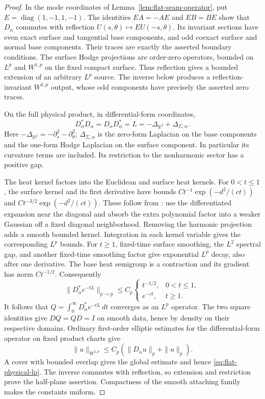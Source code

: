 \documentclass[11pt]{amsart}
\theoremstyle{definition}
\theoremstyle{remark}
\theoremstyle{plain}
\newcommand{\RR}{\mathbb{R}}
\begin{document}
\begin{proof}
In the mode coordinates of Lemma~\ref{lem:flat-seam-operator}, put
$E=\operatorname{diag}(1,-1,1,-1)$. The identities
$EA=-AE$ and $EB=BE$ show that $D_\alpha$ commutes with reflection
$U(s,\theta)\mapsto EU(-s,\theta)$. Its invariant sections have even
exact surface and tangential base components, and odd coexact surface
and normal base components. Their traces are exactly the asserted
boundary conditions. The surface Hodge projections are order-zero
operators, bounded on $L^p$ and $W^{1,p}$ on the fixed compact surface.
Thus reflection gives a bounded extension of an arbitrary $L^p$
source. The inverse below produces a reflection-invariant $W^{1,p}$
output, whose odd components have precisely the asserted zero traces.

On the full physical product, in differential-form coordinates,
\[
 D_\alpha^*D_\alpha=D_\alpha D_\alpha^*
 =L=-\Delta_{\RR^2}+\Delta_{\Sigma,\alpha}.
\]
Here $-\Delta_{\RR^2}=-\partial_s^2-\partial_\theta^2$;
$\Delta_{\Sigma,\alpha}$ is the zero-form Laplacian on the base
components and the one-form Hodge Laplacian on the surface component.
In particular its curvature terms are included. Its restriction to the
nonharmonic sector has a positive gap.

The heat kernel factors into the Euclidean and surface heat kernels.
For $0<t\leq1$, the surface kernel and its first derivative have bounds
$Ct^{-1}\exp(-d^2/(ct))$ and $Ct^{-3/2}\exp(-d^2/(ct))$.
These follow from \cite[Theorems~1.1 and 3.5]{Ludewig19}: use the
differentiated expansion near the diagonal and absorb the extra
polynomial factor into a weaker Gaussian off a fixed diagonal
neighborhood. Removing the harmonic projection adds a smooth bounded
kernel. Integration in each kernel variable gives the corresponding
$L^p$ bounds. For $t\geq1$, fixed-time surface smoothing, the $L^2$
spectral gap, and another fixed-time smoothing factor give exponential
$L^p$ decay, also after one derivative. The base heat semigroup is a
contraction and its gradient has norm $Ct^{-1/2}$. Consequently
\[
 \|D_\alpha^*e^{-tL}\|_{p\to p}
 \leq C_p\begin{cases}t^{-1/2},&0<t\leq1,\\e^{-ct},&t\geq1.\end{cases}
\]
It follows that $Q=\int_0^\infty D_\alpha^*e^{-tL}\,dt$ converges
as an $L^p$ operator. The two square identities give $DQ=QD=I$ on
smooth data, hence by density on their respective domains. Ordinary
first-order elliptic estimates for the differential-form operator on
fixed product charts give
\[
 \|u\|_{W^{1,p}}\leq C_p(\|D_\alpha u\|_p+\|u\|_p).
\]
A cover with bounded overlap gives the global estimate and hence
\eqref{eq:flat-physical-lp}. The inverse commutes with reflection, so
extension and restriction prove the half-plane assertion. Compactness
of the smooth attaching family makes the constants uniform.
\end{proof}
\end{document}

